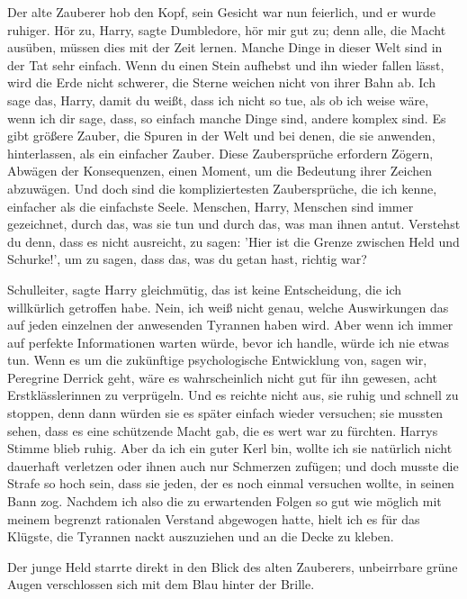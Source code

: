 Der alte Zauberer hob den Kopf, sein Gesicht war nun feierlich, und er wurde
ruhiger. \glqq Hör zu, Harry\grqq{}, sagte Dumbledore, \glqq hör mir gut zu;
denn alle, die Macht ausüben, müssen dies mit der Zeit lernen. Manche Dinge in
dieser Welt sind in der Tat sehr einfach. Wenn du einen Stein aufhebst und ihn
wieder fallen lässt, wird die Erde nicht schwerer, die Sterne weichen nicht von
ihrer Bahn ab. Ich sage das, Harry, damit du weißt, dass ich nicht so tue, als
ob ich weise wäre, wenn ich dir sage, dass, so einfach manche Dinge sind, andere
komplex sind. Es gibt größere Zauber, die Spuren in der Welt und bei denen, die
sie anwenden, hinterlassen, als ein einfacher Zauber. Diese Zaubersprüche
erfordern Zögern, Abwägen der Konsequenzen, einen Moment, um die Bedeutung ihrer
Zeichen abzuwägen. Und doch sind die kompliziertesten Zaubersprüche, die ich
kenne, einfacher als die einfachste Seele. Menschen, Harry, Menschen sind immer
gezeichnet, durch das, was sie tun und durch das, was man ihnen antut. Verstehst
du denn, dass es nicht ausreicht, zu sagen: 'Hier ist die Grenze zwischen Held
und Schurke!', um zu sagen, dass das, was du getan hast, richtig war?\grqq{}

\glqq Schulleiter\grqq{}, sagte Harry gleichmütig, \glqq das ist keine
Entscheidung, die ich willkürlich getroffen habe. Nein, ich weiß nicht genau,
welche Auswirkungen das auf jeden einzelnen der anwesenden Tyrannen haben wird.
Aber wenn ich immer auf perfekte Informationen warten würde, bevor ich handle,
würde ich nie etwas tun. Wenn es um die zukünftige psychologische Entwicklung
von, sagen wir, Peregrine Derrick geht, wäre es wahrscheinlich nicht gut für ihn
gewesen, acht Erstklässlerinnen zu verprügeln. Und es reichte nicht aus, sie
ruhig und schnell zu stoppen, denn dann würden sie es später einfach wieder
versuchen; sie mussten sehen, dass es eine schützende Macht gab, die es wert war
zu fürchten.\grqq{} Harrys Stimme blieb ruhig. \glqq Aber da ich ein guter Kerl
bin, wollte ich sie natürlich nicht dauerhaft verletzen oder ihnen auch nur
Schmerzen zufügen; und doch musste die Strafe so hoch sein, dass sie jeden, der
es noch einmal versuchen wollte, in seinen Bann zog. Nachdem ich also die zu
erwartenden Folgen so gut wie möglich mit meinem begrenzt rationalen Verstand
abgewogen hatte, hielt ich es für das Klügste, die Tyrannen nackt auszuziehen
und an die Decke zu kleben.\grqq{}

Der junge Held starrte direkt in den Blick des alten Zauberers, unbeirrbare
grüne Augen verschlossen sich mit dem Blau hinter der Brille.

